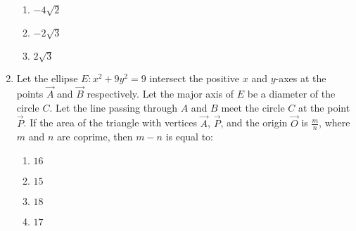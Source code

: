 \documentclass[journal]{IEEEtran}
\begin{document}
\begin{enumerate}[start=16]
\begin{enumerate}
    \item $-4\sqrt{2}$
    \item $-2\sqrt{3}$
    \item $2\sqrt{3}$
\end{enumerate}
\item Let the ellipse $E: x^2 + 9y^2 = 9$ intersect the positive $x$ and $y$-axes at the points $\vec{A}$ and $\vec{B}$ respectively. Let the major axis of $E$ be a diameter of the circle $C$. Let the line passing through $A$ and $B$ meet the circle $C$ at the point $\vec{P}$. If the area of the triangle with vertices $\vec{A}$, $\vec{P}$, and the origin $\vec{O}$ is $\frac{m}{n}$, where $m$ and $n$ are coprime, then $m - n$ is equal to:
\begin{enumerate}
    \item $16$
    \item $15$
    \item $18$
    \item $17$
\end{enumerate}


\end{enumerate}
\end{document}
